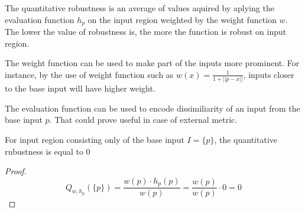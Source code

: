 The quantitative robustness is an average of values aquired by
aplying the evaluation function $h_p$ on the input region
weighted by the weight function $w$. The lower the value of robustness is,
the more the function is robust on input region.

The weight function can be used to make part of the inputs more prominent.
For instance, by the use of weight function such as $w(x) = \frac{1}{1+||p-x||}$,
inputs closer to the base input will have higher weight.

The evaluation function can be used to encode dissimiliarity of an input
from the base input $p$. That could prove useful in case of external metric.

\begin{lemma}{For input region consisting only of the base input $I=\{p\}$,
    the quantitative rubustness is equal to 0}
    \begin{proof}
        \begin{equation*}
            Q_{w, h_p}(\{p\}) = \frac{w(p)\cdot h_p(p)}{w(p)} = \frac{w(p)}{w(p)}\cdot 0 = 0
        \end{equation*}
    \end{proof}
\end{lemma}

